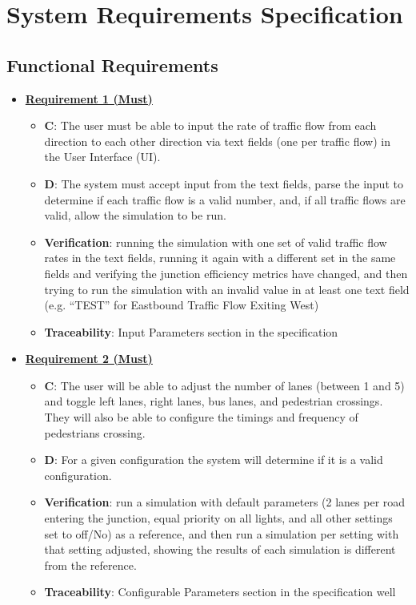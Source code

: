 \documentclass{article}
\begin{document}
\section{System Requirements Specification}
\subsection{Functional Requirements}
\begin{itemize}
    \item \textbf{\underline{Requirement 1 (Must)}}
    \begin{itemize}
        \item \textbf{C}: The user must be able to input the rate of traffic flow from 
            each direction to each other direction via text fields (one per traffic flow) 
            in the User Interface (UI).
        \item \textbf{D}: The system must accept input from the text fields, parse the input to 
            determine if each traffic flow is a valid number, and, if all traffic flows 
            are valid, allow the simulation to be run.
        \item \textbf{Verification}: running the simulation with one set of valid traffic 
            flow rates in the text fields, running it again with a different set in 
            the same fields and verifying the junction efficiency metrics have changed, 
            and then trying to run the simulation with an invalid value in at least one 
            text field (e.g. “TEST” for Eastbound Traffic Flow Exiting West)
        \item\textbf{Traceability}: Input Parameters section in the specification
    \end{itemize}
    
    \item \textbf{\underline{Requirement 2 (Must)}}
    \begin{itemize}
        \item \textbf{C}: The user will be able to adjust the number of lanes (between 1 and 5) 
            and toggle left lanes, right lanes, bus lanes, and pedestrian crossings. They will 
            also be able to configure the timings and frequency of pedestrians crossing.
        \item \textbf{D}: For a given configuration the system will determine if it is a valid 
            configuration.
        \item \textbf{Verification}: run a simulation with default parameters (2 lanes per 
            road entering the junction, equal priority on all lights, and all other 
            settings set to off/No) as a reference, and then run a simulation per setting 
            with that setting adjusted, showing the results of each simulation is different 
            from the reference.
        \item\textbf{Traceability}: Configurable Parameters section in the specification well
    \end{itemize}


\end{itemize}
\end{document}
